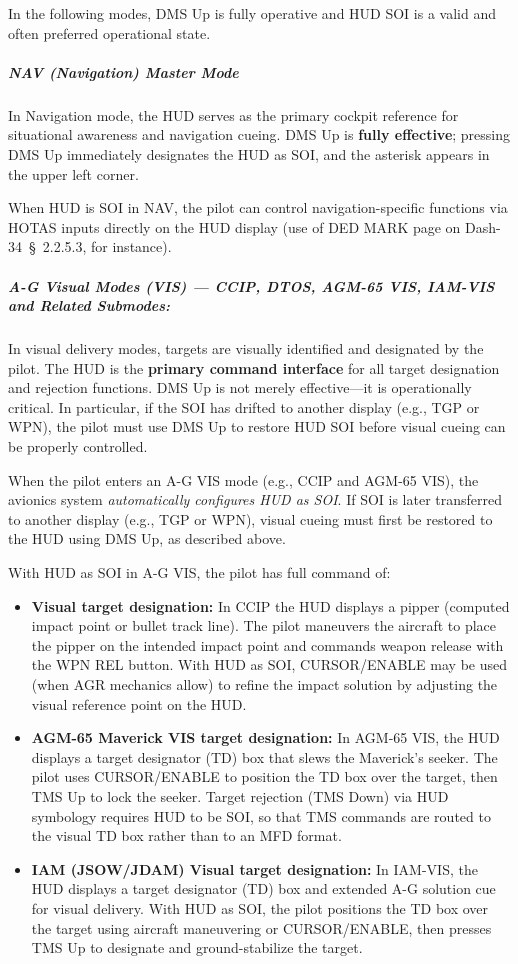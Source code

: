 \documentclass[11pt,a4paper]{article}
\providecommand{\dashref}[1]{Dash-34~\S~#1}
\begin{document}
In the following modes, DMS Up is fully operative and HUD SOI is a valid and often preferred operational state.

\subparagraph*{NAV (Navigation) Master Mode}

In Navigation mode, the HUD serves as the primary cockpit reference for situational awareness and navigation cueing. DMS Up is \textbf{fully effective}; pressing DMS Up immediately designates the HUD as SOI, and the asterisk appears in the upper left corner.

When HUD is SOI in NAV, the pilot can control navigation-specific functions via HOTAS inputs directly on the HUD display (use of DED MARK page on \dashref{2.2.5.3}, for instance).

\subparagraph*{A-G Visual Modes (VIS) --- CCIP, DTOS, AGM-65 VIS, IAM-VIS and Related Submodes:}

In visual delivery modes, targets are visually identified and designated by the pilot. The HUD is the \textbf{primary command interface} for all target designation and rejection functions. DMS Up is not merely effective---it is operationally critical. In particular, if the SOI has drifted to another display (e.g., TGP or WPN), the pilot must use DMS Up to restore HUD SOI before visual cueing can be properly controlled.

When the pilot enters an A-G VIS mode (e.g., CCIP and AGM-65 VIS), the avionics system \textit{automatically configures HUD as SOI}. If SOI is later transferred to another display (e.g., TGP or WPN), visual cueing must first be restored to the HUD using DMS Up, as described above.

With HUD as SOI in A-G VIS, the pilot has full command of:

\begin{itemize}

\item \textbf{Visual target designation:} In CCIP the HUD displays a pipper (computed impact point or bullet track line). The pilot maneuvers the aircraft to place the pipper on the intended impact point and commands weapon release with the WPN REL button. With HUD as SOI, CURSOR/ENABLE may be used (when AGR mechanics allow) to refine the impact solution by adjusting the visual reference point on the HUD.

\item \textbf{AGM-65 Maverick VIS target designation:} In AGM-65 VIS, the HUD displays a target designator (TD) box that slews the Maverick's seeker. The pilot uses CURSOR/ENABLE to position the TD box over the target, then TMS Up to lock the seeker. Target rejection (TMS Down) via HUD symbology requires HUD to be SOI, so that TMS commands are routed to the visual TD box rather than to an MFD format.

\item \textbf{IAM (JSOW/JDAM) Visual target designation:} In IAM-VIS, the HUD displays a target designator (TD) box and extended A-G solution cue for visual delivery. With HUD as SOI, the pilot positions the TD box over the target using aircraft maneuvering or CURSOR/ENABLE, then presses TMS Up to designate and ground-stabilize the target.

\end{itemize}
\end{document}
